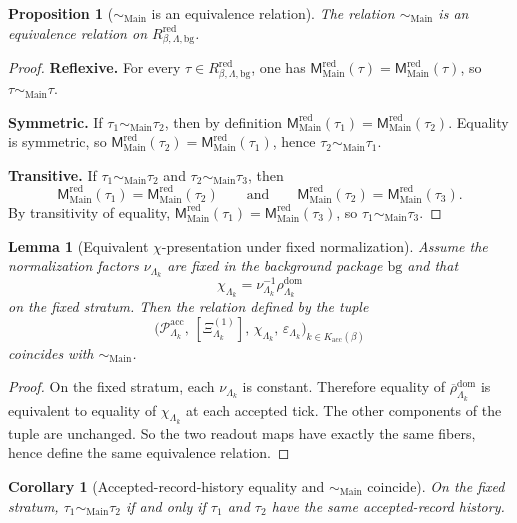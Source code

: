 \documentclass[11pt]{article}
\newtheorem{proposition}{Proposition}
\newtheorem{lemma}{Lemma}
\newtheorem{corollary}{Corollary}
\newcommand{\RMain}{R^{\mathrm{red}}_{\beta,\Lambda,\mathrm{bg}}}
\newcommand{\MMain}{\mathsf M^{\mathrm{red}}_{\mathrm{Main}}}
\newcommand{\XiOne}{\Xi^{(1)}}
\newcommand{\rhobar}{\overline{\rho}^{\mathrm{dom}}}
\begin{document}
\begin{proposition}[\(\sim_{\mathrm{Main}}\) is an equivalence relation]
The relation \(\sim_{\mathrm{Main}}\) is an equivalence relation on \(\RMain\).
\end{proposition}

\begin{proof}
\textbf{Reflexive.}
For every \(\tau\in\RMain\), one has \(\MMain(\tau)=\MMain(\tau)\), so
\(\tau\sim_{\mathrm{Main}}\tau\).

\textbf{Symmetric.}
If \(\tau_1\sim_{\mathrm{Main}}\tau_2\), then by definition
\(\MMain(\tau_1)=\MMain(\tau_2)\).
Equality is symmetric, so \(\MMain(\tau_2)=\MMain(\tau_1)\), hence
\(\tau_2\sim_{\mathrm{Main}}\tau_1\).

\textbf{Transitive.}
If \(\tau_1\sim_{\mathrm{Main}}\tau_2\) and \(\tau_2\sim_{\mathrm{Main}}\tau_3\), then
\[
\MMain(\tau_1)=\MMain(\tau_2)
\qquad\text{and}\qquad
\MMain(\tau_2)=\MMain(\tau_3).
\]
By transitivity of equality,
\(\MMain(\tau_1)=\MMain(\tau_3)\), so \(\tau_1\sim_{\mathrm{Main}}\tau_3\).
\end{proof}

\begin{lemma}[Equivalent \(\chi\)-presentation under fixed normalization]
Assume the normalization factors \(\nu_{\Lambda_k}\) are fixed in the background package
\(\mathrm{bg}\) and that
\[
\chi_{\Lambda_k}=\nu_{\Lambda_k}^{-1}\rho^{\mathrm{dom}}_{\Lambda_k}
\]
on the fixed stratum.
Then the relation defined by the tuple
\[
\Big(
\mathcal P^{\mathrm{acc}}_{\Lambda_k},\,
[\XiOne_{\Lambda_k}],\,\chi_{\Lambda_k},\,\varepsilon_{\Lambda_k}
\Big)_{k\in K_{\mathrm{acc}}(\beta)}
\]
coincides with \(\sim_{\mathrm{Main}}\).
\end{lemma}

\begin{proof}
On the fixed stratum, each \(\nu_{\Lambda_k}\) is constant.
Therefore equality of \(\rhobar_{\Lambda_k}\) is equivalent to equality of \(\chi_{\Lambda_k}\) at
each accepted tick.
The other components of the tuple are unchanged.
So the two readout maps have exactly the same fibers, hence define the same equivalence relation.
\end{proof}

\begin{corollary}[Accepted-record-history equality and \(\sim_{\mathrm{Main}}\) coincide]
On the fixed stratum, \(\tau_1\sim_{\mathrm{Main}}\tau_2\) if and only if \(\tau_1\) and \(\tau_2\)
have the same accepted-record history.
\end{corollary}
\end{document}
